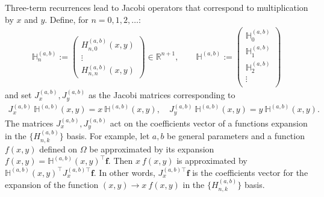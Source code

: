 \documentclass[11pt, oneside]{article}   	%
\newcommand{\R}{\mathbb{R}}
\newcommand{\hdop}{H}
\newcommand{\bighdop}{\mathbb{\hdop}}
\newcommand{\hdopab}{\hdop^{(a,b)}}
\newcommand{\hdopnkab}{\hdop_{n,k}^{(a,b)}}
\newcommand{\bighdopab}{\bighdop^{(a,b)}}
\begin{document}
Three-term recurrences lead to Jacobi operators that correspond to multiplication by $x$ and $y$. Define, for $n=0,1,2,\dots$: 
\begin{align*}
\bighdopab_n := \begin{pmatrix}
		\hdopab_{n,0}(x,y) \\
		\vdots \\
		\hdopab_{n,n}(x,y)
	\end{pmatrix} \in \R^{n+1}, 
\quad \quad 
\bighdopab := \begin{pmatrix}
		\bighdopab_0 \\
		\bighdopab_1 \\
		\bighdopab_2 \\
		\vdots \\
	\end{pmatrix}
\end{align*}
and set $J_x^{(a,b)}, J_y^{(a,b)}$ as the Jacobi matrices corresponding to
\begin{align}
J_x^{(a,b)} \: \bighdopab(x,y) = x \: \bighdopab(x,y), \quad J_y^{(a,b)} \: \bighdopab(x,y) = y \: \bighdopab(x,y).
\label{eqn:jacobimatricesdefinition}
\end{align}
The matrices $J_x^{(a,b)}, J_y^{(a,b)}$ act on the coefficients vector of a functions expansion in the $\{\hdopnkab\}$ basis. For example, let $a, b$ be general parameters and a function $f(x,y)$ defined on $\Omega$ be approximated by its expansion $f(x,y) = \bighdopab(x,y)^\top \mathbf{f}$. Then $x \: f(x,y)$ is approximated by $\bighdopab(x,y)^\top {J_x^{(a,b)\top}} \mathbf{f}$. In other words, ${J_x^{(a,b)\top}} \mathbf{f}$ is the coefficients vector for the expansion of the function $(x,y) \to x \: f(x,y)$ in the  $\{\hdopnkab\}$ basis.
\end{document}
